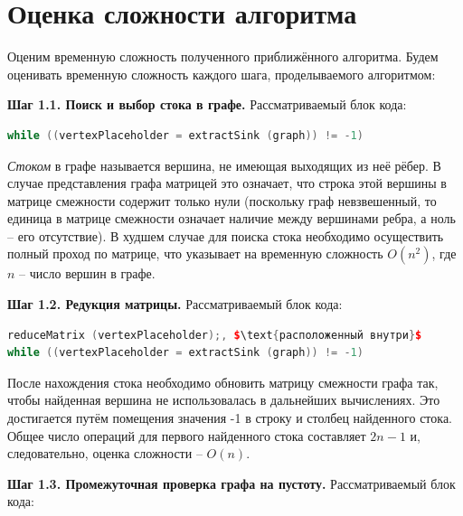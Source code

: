 \documentclass[spec, och, otchet, hidelinks]{SCWorks}
\begin{document}
\section*{Оценка сложности алгоритма}

\par Оценим временную сложность полученного приближённого алгоритма. Будем оценивать временную сложность каждого шага, проделываемого алгоритмом:

\par \textbf{Шаг 1.1. Поиск и выбор стока в графе.} Рассматриваемый блок кода:

\begin{lstlisting}[caption={Блок кода, отвечающий за поиск стока.},style=listingStyle, mathescape=true, language=C++]
while ((vertexPlaceholder = extractSink (graph)) != -1)
\end{lstlisting}

\textit{Стоком} в графе называется вершина, не имеющая выходящих из неё рёбер. В случае представления графа матрицей это означает, что строка этой 
вершины в матрице смежности содержит только нули (поскольку граф невзвешенный, то единица в матрице смежности означает наличие между вершинами ребра, 
а ноль -- его отсутствие). В худшем случае для поиска стока необходимо осуществить  полный проход по матрице, что указывает на временную сложность
$O(n^2)$, где $n$ -- число вершин в графе.

\par \textbf{Шаг 1.2. Редукция матрицы.} Рассматриваемый блок кода:

\begin{lstlisting}[caption={Блок кода, отвечающий за редукцию матрицы.},style=listingStyle, mathescape=true, language=C++]
reduceMatrix (vertexPlaceholder);, $\text{расположенный внутри}$
while ((vertexPlaceholder = extractSink (graph)) != -1)
\end{lstlisting}

После нахождения стока необходимо обновить матрицу смежности графа так, чтобы найденная вершина не использовалась
в дальнейших вычислениях. Это достигается путём помещения значения -1 в строку и столбец найденного стока. Общее число операций для первого найденного
стока составляет $2n - 1$ и, следовательно, оценка сложности -- $O(n)$. 

\par \textbf{Шаг 1.3. Промежуточная проверка графа на пустоту.} Рассматриваемый блок кода: 
\end{document}
